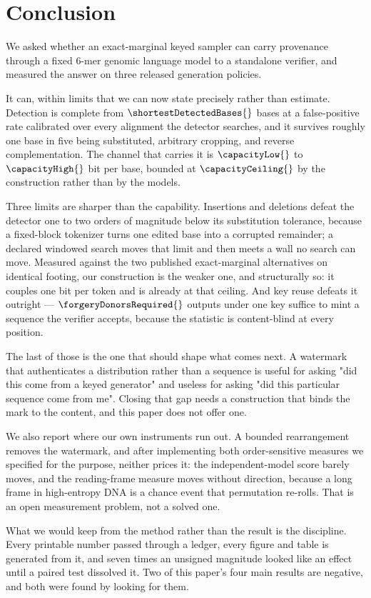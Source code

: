 \section{Conclusion}

We asked whether an exact-marginal keyed sampler can carry provenance through a fixed 6-mer genomic
language model to a standalone verifier, and measured the answer on three released generation policies.

It can, within limits that we can now state precisely rather than estimate. Detection is complete from
$\shortestDetectedBases{}$ bases at a false-positive rate calibrated over every alignment the detector
searches, and it survives roughly one base in five being substituted, arbitrary cropping, and reverse
complementation. The channel that carries it is $\capacityLow{}$ to $\capacityHigh{}$ bit per base,
bounded at $\capacityCeiling{}$ by the construction rather than by the models.

Three limits are sharper than the capability. Insertions and deletions defeat the detector one to two
orders of magnitude below its substitution tolerance, because a fixed-block tokenizer turns one edited
base into a corrupted remainder; a declared windowed search moves that limit and then meets a wall no
search can move. Measured against the two published exact-marginal alternatives on identical footing,
our construction is the weaker one, and structurally so: it couples one bit per token and is already at
that ceiling. And key reuse defeats it outright --- $\forgeryDonorsRequired{}$ outputs under one key
suffice to mint a sequence the verifier accepts, because the statistic is content-blind at every
position.

The last of those is the one that should shape what comes next. A watermark that authenticates a
distribution rather than a sequence is useful for asking "did this come from a keyed generator" and
useless for asking "did this particular sequence come from me". Closing that gap needs a construction
that binds the mark to the content, and this paper does not offer one.

We also report where our own instruments run out. A bounded rearrangement removes the watermark, and
after implementing both order-sensitive measures we specified for the purpose, neither prices it: the
independent-model score barely moves, and the reading-frame measure moves without direction, because a
long frame in high-entropy DNA is a chance event that permutation re-rolls. That is an open measurement
problem, not a solved one.

What we would keep from the method rather than the result is the discipline. Every printable number
passed through a ledger, every figure and table is generated from it, and seven times an unsigned
magnitude looked like an effect until a paired test dissolved it. Two of this paper's four main results
are negative, and both were found by looking for them.
